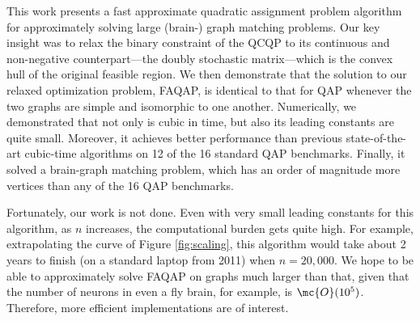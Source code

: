 \documentclass[10pt,journal,cspaper,compsoc]{IEEEtran}
\begin{document}
This work presents a fast approximate quadratic assignment problem algorithm \faqap for approximately solving large (brain-) graph matching problems.  Our key insight was to relax the binary constraint of the QCQP to its continuous and non-negative counterpart---the doubly stochastic matrix---which is the convex hull of the original feasible region.  We then demonstrate that the solution to our relaxed optimization problem, FAQAP, is identical to that for QAP whenever the two graphs are simple and isomorphic to one another. Numerically, we demonstrated that not only is \faqap cubic in time, but also its leading constants are quite small.  Moreover, it achieves better performance than previous state-of-the-art cubic-time algorithms on 12 of the 16 standard QAP benchmarks.  Finally, it solved a brain-graph matching problem, which has an order of magnitude more vertices than any of the 16 QAP benchmarks.



Fortunately, our work is not done. Even with very small leading constants for this algorithm, as $n$ increases, the computational burden gets quite high.  For example, extrapolating the curve of Figure \ref{fig:scaling}, this algorithm would take about 2 years to finish (on a standard laptop from 2011) when $n=20,000$.  We hope to be able to approximately solve FAQAP on graphs much larger than that, given that the number of neurons in even a fly brain, for example, is $\mc{O}(10^5)$.  Therefore, more efficient implementations are of interest.  
\end{document}

